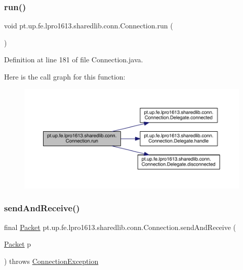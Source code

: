 \subsubsection{\texorpdfstring{run()}{run()}}
{\footnotesize\ttfamily void pt.\+up.\+fe.\+lpro1613.\+sharedlib.\+conn.\+Connection.\+run (\begin{DoxyParamCaption}{ }\end{DoxyParamCaption})}



Definition at line 181 of file Connection.\+java.

Here is the call graph for this function\+:
\nopagebreak
\begin{figure}[H]
\begin{center}
\leavevmode
\includegraphics[width=350pt]{classpt_1_1up_1_1fe_1_1lpro1613_1_1sharedlib_1_1conn_1_1_connection_ad2971acbca89cf81dcb5fe0ece0a53c4_cgraph}
\end{center}
\end{figure}
\hypertarget{classpt_1_1up_1_1fe_1_1lpro1613_1_1sharedlib_1_1conn_1_1_connection_ac70216d1f9f5ed2c8b29431b10108620}{}\label{classpt_1_1up_1_1fe_1_1lpro1613_1_1sharedlib_1_1conn_1_1_connection_ac70216d1f9f5ed2c8b29431b10108620} 
\subsubsection{\texorpdfstring{send\+And\+Receive()}{sendAndReceive()}}
{\footnotesize\ttfamily final \hyperlink{classpt_1_1up_1_1fe_1_1lpro1613_1_1sharedlib_1_1conn_1_1_packet}{Packet} pt.\+up.\+fe.\+lpro1613.\+sharedlib.\+conn.\+Connection.\+send\+And\+Receive (\begin{DoxyParamCaption}\item[{\hyperlink{classpt_1_1up_1_1fe_1_1lpro1613_1_1sharedlib_1_1conn_1_1_packet}{Packet}}]{p }\end{DoxyParamCaption}) throws \hyperlink{classpt_1_1up_1_1fe_1_1lpro1613_1_1sharedlib_1_1exceptions_1_1_connection_exception}{Connection\+Exception}}

